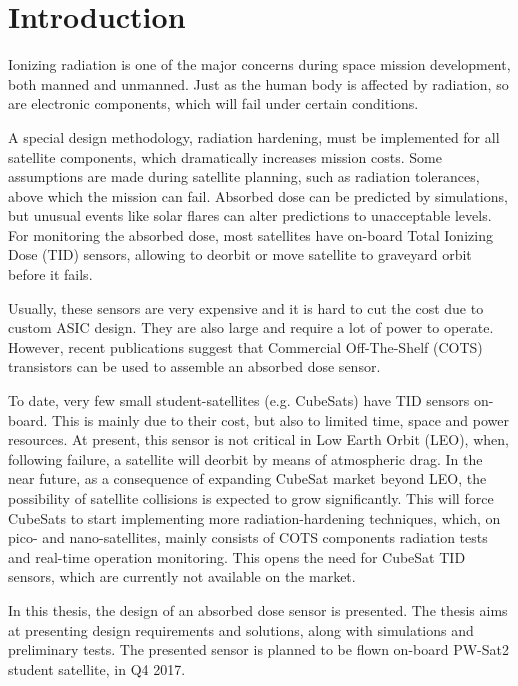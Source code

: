 \chapter{Introduction}
    Ionizing radiation is one of the major concerns during space mission development, both manned and unmanned. Just as the human body is affected by radiation, so are electronic components, which will fail under certain conditions.

    A special design methodology, radiation hardening, must be implemented for all satellite components, which dramatically increases mission costs. Some assumptions are made during satellite planning, such as radiation tolerances, above which the mission can fail. Absorbed dose can be predicted by simulations, but unusual events like solar flares can alter predictions to unacceptable levels. For monitoring the absorbed dose, most satellites have on-board Total Ionizing Dose (TID) sensors, allowing to deorbit or move satellite to graveyard orbit before it fails.

    Usually, these sensors are very expensive and it is hard to cut the cost due to custom ASIC design. They are also large and require a lot of power to operate. However, recent publications suggest that Commercial Off-The-Shelf (COTS) transistors can be used to assemble an absorbed dose sensor.

    To date, very few small student-satellites (e.g. CubeSats) have TID sensors on-board. This is mainly due to their cost, but also to limited time, space and power resources. At present, this sensor is not critical in Low Earth Orbit (LEO), when, following failure, a satellite will deorbit by means of atmospheric drag. In the near future, as a consequence of expanding CubeSat market beyond LEO, the possibility of satellite collisions is expected to grow significantly. This will force CubeSats to start implementing more radiation-hardening techniques, which, on pico- and nano-satellites, mainly consists of COTS components radiation tests and real-time operation monitoring. This opens the need for CubeSat TID sensors, which are currently not available on the market.

    In this thesis, the design of an absorbed dose sensor is presented. The thesis aims at presenting design requirements and solutions, along with simulations and preliminary tests. The presented sensor is planned to be flown on-board PW-Sat2 student satellite, in Q4 2017.

